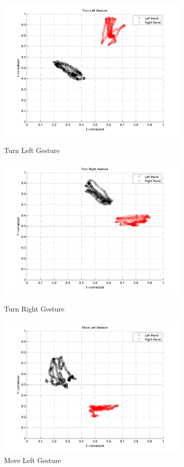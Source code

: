 \begin{figure}
	\begin{minipage}
		{.5 
		\textwidth} \hspace{-15 mm} 
		\includegraphics[height=70mm]{figures/result/train-turn-left.png} \caption*{Turn Left Gesture} 
	\end{minipage}
	\begin{minipage}
		{.5 
		\textwidth} 
		\includegraphics[height=70mm]{figures/result/train-turn-right.png} \caption*{Turn Right Gesture} 
	\end{minipage}
	\begin{minipage}
		{.5 
		\textwidth} \hspace{-15 mm} 
		\includegraphics[height=70mm]{figures/result/train-move-left.png} \caption*{Move Left Gesture} 

\end{minipage}
\end{figure}
